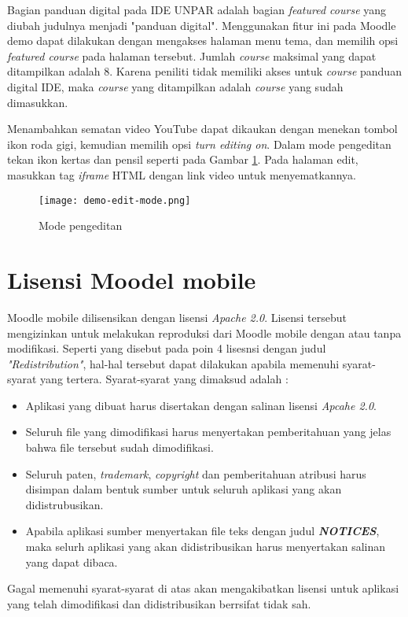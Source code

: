 Bagian panduan digital pada IDE UNPAR adalah bagian \textit{featured course} yang diubah judulnya menjadi "panduan digital". Menggunakan fitur ini pada Moodle demo dapat dilakukan dengan mengakses halaman menu tema, dan memilih opsi \textit{featured course} pada halaman tersebut. Jumlah \textit{course} maksimal yang dapat ditampilkan adalah 8. Karena peniliti tidak memiliki akses untuk \textit{course} panduan digital IDE, maka \textit{course} yang ditampilkan adalah \textit{course} yang sudah dimasukkan.

Menambahkan sematan video YouTube dapat dikaukan dengan menekan tombol ikon roda gigi, kemudian memilih opsi \textit{turn editing on}. Dalam mode pengeditan tekan ikon kertas dan pensil seperti pada Gambar \ref{fig:editingmode}. Pada halaman edit, masukkan tag \textit{iframe} HTML dengan link video untuk menyematkannya.

\begin{figure}[H] 
	\centering  
	\texttt{[image: demo-edit-mode.png]}  
	\caption[Mode pengeditan] {Mode pengeditan} 
	\label{fig:editingmode} 
\end{figure} 

\section{Lisensi Moodel mobile}

Moodle mobile dilisensikan dengan lisensi \textit{Apache 2.0}\cite{Moodlemobile:license}. Lisensi tersebut mengizinkan untuk melakukan reproduksi dari Moodle mobile dengan atau tanpa modifikasi. Seperti yang disebut pada poin 4 lisesnsi dengan judul \textit{"Redistribution"}, hal-hal tersebut dapat dilakukan apabila memenuhi syarat-syarat yang tertera. Syarat-syarat yang dimaksud adalah :
\begin{itemize}
\item Aplikasi yang dibuat harus disertakan dengan salinan lisensi \textit{Apcahe 2.0}.
\item Seluruh file yang dimodifikasi harus menyertakan pemberitahuan yang jelas bahwa file tersebut sudah dimodifikasi.
\item Seluruh paten, \textit{trademark}, \textit{copyright} dan pemberitahuan atribusi harus disimpan dalam bentuk sumber untuk seluruh aplikasi yang akan didistrubusikan.
\item Apabila aplikasi sumber menyertakan file teks dengan judul \textit{\textbf{NOTICES}}, maka selurh aplikasi yang akan didistribusikan harus menyertakan salinan yang dapat dibaca.
\end{itemize}
Gagal memenuhi syarat-syarat di atas akan mengakibatkan lisensi untuk aplikasi yang telah dimodifikasi dan didistribusikan berrsifat tidak sah.